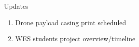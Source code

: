 





\begin{frame}{Updates}
    \begin{enumerate}
        \item Drone payload casing print scheduled
        \item WES students project overview/timeline
    \end{enumerate}
\end{frame}

